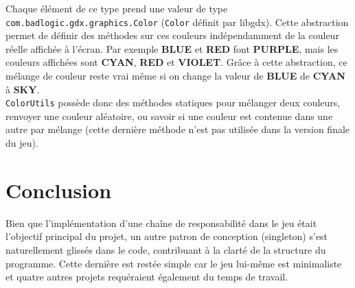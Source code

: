 \documentclass[11pt,a4paper,twoside,svgnames]{article}
\begin{document}
Chaque élément de ce type prend une valeur de type \texttt{com.badlogic.gdx.graphics.Color} (\texttt{Color} définit par libgdx). Cette abstraction permet de définir des méthodes sur ces couleurs indépendamment de la couleur réelle affichée à l'écran. Par exemple \textbf{BLUE} et \textbf{RED} font \textbf{PURPLE}, mais les couleurs affichées sont \textbf{CYAN}, \textbf{RED} et \textbf{VIOLET}. Grâce à cette abstraction, ce mélange de couleur reste vrai même si on change la valeur de \textbf{BLUE} de \textbf{CYAN} à \textbf{SKY}.\\

\texttt{ColorUtils} possède donc des méthodes statiques pour mélanger deux couleurs, renvoyer une couleur aléatoire, ou savoir si une couleur est contenue dans une autre par mélange (cette dernière méthode n'est pas utilisée dans la version finale du jeu).

\clearpage

\section{Conclusion}
Bien que l'implémentation d'une chaîne de responsabilité dans le jeu était l'objectif principal du projet, un autre patron de conception (singleton) s'est naturellement glissés dans le code, contribuant à la clarté de la structure du programme. Cette dernière est restée simple car le jeu lui-même est minimaliste et quatre autres projets requéraient également du temps de travail.
\end{document}
